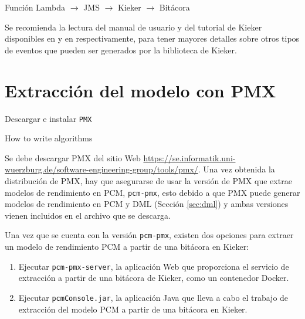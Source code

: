 \begin{center}
Función Lambda $\rightarrow$ JMS $\rightarrow$ Kieker $\rightarrow$ Bitácora
\end{center}

Se recomienda la lectura del manual de usuario y del tutorial de Kieker disponibles en \cite{kieker-user-guide} y en \cite{kieker-icpe-tutorial-2014} respectivamente, para tener mayores detalles sobre otros tipos de eventos que pueden ser generados por la biblioteca de Kieker.

\section{Extracción del modelo con PMX}

\begin{singlespace}
\begin{algorithm}[H]
\SetAlgoLined

Descargar e instalar \texttt{PMX}\;
\caption{How to write algorithms}
\end{algorithm}
\end{singlespace}


Se debe descargar PMX del sitio Web \url{https://se.informatik.uni-wuerzburg.de/software-engineering-group/tools/pmx/}. Una vez obtenida la distribución de PMX, hay que asegurarse de usar la versión de PMX que extrae modelos de rendimiento en PCM, \texttt{pcm-pmx}, esto debido a que PMX puede generar modelos de rendimiento en PCM y DML (Sección \ref{sec:dml}) y ambas versiones vienen incluidos en el archivo que se descarga.

Una vez que se cuenta con la versión \texttt{pcm-pmx}, existen dos opciones para extraer un modelo de rendimiento PCM a partir de una bitácora en Kieker:
\begin{enumerate}
    \item Ejecutar \texttt{pcm-pmx-server}, la aplicación Web que proporciona el servicio de extracción a partir de una bitácora de Kieker, como un contenedor Docker.
    \item Ejecutar \texttt{pcmConsole.jar}, la aplicación Java que lleva a cabo el trabajo de extracción del modelo PCM a partir de una bitácora en Kieker.
\end{enumerate}

